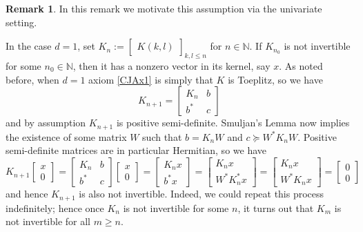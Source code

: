 \documentclass[11pt,reqno]{amsart}
\def\NN{\mathbb{N}}
\theoremstyle{definition}
\newtheorem{remark}[theorem]{Remark}
\numberwithin{equation}{section}
\begin{document}
\begin{remark}
    In this remark we motivate this assumption via the univariate setting.
    
    In the case \(d = 1\), set \(K_n := \begin{bmatrix}K(k,l)\end{bmatrix}_{k,l \leq n}\) for \(n \in \NN\). If \(K_{n_0}\) is not invertible for some \(n_0 \in \NN\), then it has a nonzero vector in its kernel, say \(x\). As noted before, when \(d = 1\) axiom \eqref{CJAx1} is simply that \(K\) is Toeplitz, so we have
    \[
        K_{n+1} = \begin{bmatrix} K_n & b \\ b^* & c \end{bmatrix}
    \]
    and by assumption \(K_{n+1}\) is positive semi-definite. Smuljan's Lemma \cite{Smu59} now implies the existence of some matrix \(W\) such that \( b = K_n W\) and \(c \succeq W^* K_n W\). Positive semi-definite matrices are in particular Hermitian, so we have
    \[
        K_{n+1} \begin{bmatrix} x \\ 0 \end{bmatrix} =  \begin{bmatrix} K_n & b \\ b^* & c \end{bmatrix}\begin{bmatrix} x \\ 0 \end{bmatrix} = \begin{bmatrix} K_n x \\ b^* x \end{bmatrix} = \begin{bmatrix} K_n x \\ W^* K_n^* x \end{bmatrix} = \begin{bmatrix} K_n x \\ W^* K_n x \end{bmatrix} = \begin{bmatrix} 0 \\ 0 \end{bmatrix}
    \]
    and hence \(K_{n+1}\) is also not invertible. Indeed, we could repeat this process indefinitely; hence once \(K_n\) is not invertible for some \(n\), it turns out that \(K_m\) is not invertible for all \(m \geq n\).
    

\end{remark}
\end{document}
